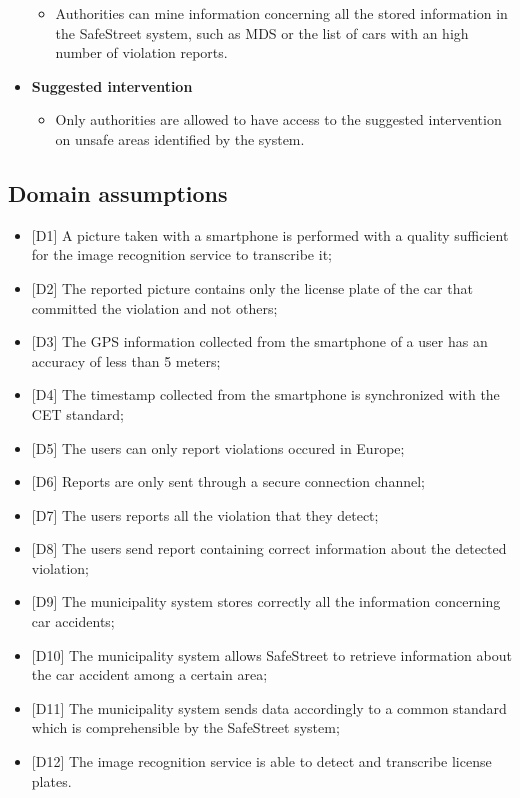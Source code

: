 \begin{itemize}
\begin{itemize}
            \item Authorities can mine information concerning all the stored information in the SafeStreet system, such as MDS or the list of cars with an high number of violation reports.
        \end{itemize}
    \item \textbf{Suggested intervention}
        \begin{itemize}
            \item Only authorities are allowed to have access to the suggested intervention on unsafe areas identified by the system.
        \end{itemize}
    \end{itemize}
\subsection{Domain assumptions}
\begin{itemize}
    \item {[D1]}  A picture taken with a smartphone is performed with a quality sufficient for the image recognition service to transcribe it;
    \item {[D2]}  The reported picture contains only the license plate of the car that committed the violation and not others;
    \item {[D3]}  The GPS information collected from the smartphone of a user has an accuracy of less than 5 meters;
    \item {[D4]}  The timestamp collected from the smartphone is synchronized with the CET standard;
    \item {[D5]}  The users can only report violations occured in Europe;
    \item {[D6]}  Reports are only sent through a secure connection channel;
    \item {[D7]}  The users reports all the violation that they detect;
    \item {[D8]}  The users send report containing correct information about the detected violation;
    \item {[D9]}  The municipality system stores correctly all the information concerning car accidents;
    \item {[D10]} The municipality system allows SafeStreet to retrieve information about the car accident among a certain area;
    \item {[D11]} The municipality system sends data accordingly to a common standard which is comprehensible by the SafeStreet system;
    \item {[D12]} The image recognition service is able to detect and transcribe license plates.
\end{itemize}


